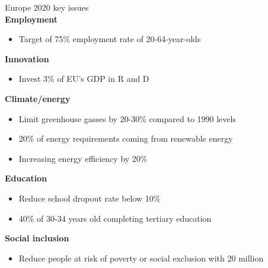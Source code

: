 \documentclass{beamer}
\begin{document}
\begin{frame}
  Europe 2020 key issues\\
  \textbf{Employment}
  \begin{itemize}
    \item Target of 75\% employment rate of 20-64-year-olds
  \end{itemize}

  \textbf{Innovation}
  \begin{itemize}
    \item Invest 3\% of EU's GDP in R and D
  \end{itemize}
  
  \textbf{Climate/energy}
  \begin{itemize}
    \item Limit greenhouse gasses by 20-30\% compared to 1990 levels
    \item 20\% of energy requirements coming from renewable energy
    \item Increasing energy efficiency by 20\%
  \end{itemize}
  
  \textbf{Education}
  \begin{itemize}
    \item Reduce school dropout rate below 10\%
    \item 40\% of 30-34 years old completing tertiary education
  \end{itemize}
  
  \textbf{Social inclusion}
  \begin{itemize}  
    \item Reduce people at risk of poverty or social exclusion with 20 million
  \end{itemize}
\end{frame}

\end{document}
